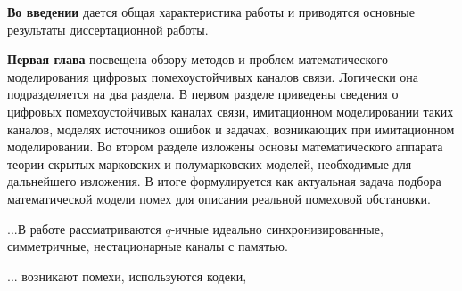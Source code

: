 \documentclass[twoside,12pt]{article}
\begin{document}
\textbf{Во введении} дается общая характеристика работы и приводятся основные результаты диссертационной работы.

\textbf{Первая глава} посвещена обзору методов и проблем математического моделирования цифровых помехоустойчивых каналов связи. Логически она подразделяется на два раздела. В первом разделе приведены сведения о цифровых помехоустойчивых каналах связи, имитационном моделировании таких каналов, моделях источников ошибок и задачах, возникающих при имитационном моделировании. Во втором разделе изложены основы математического аппарата теории скрытых марковских и полумарковских моделей, необходимые для дальнейшего изложения. В итоге формулируется как актуальная задача подбора математической модели помех для описания реальной помеховой обстановки.

%
...В работе рассматриваются $q$-ичные идеально синхронизированные, симметричные, нестационарные каналы с памятью.

... возникают помехи, используются кодеки, 
\end{document}
